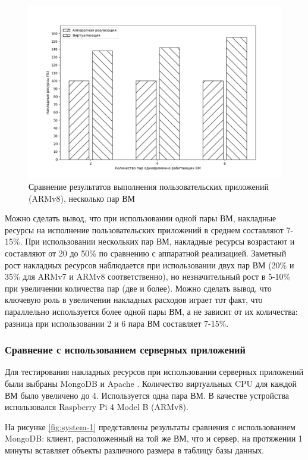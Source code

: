 \begin{figure}[h]
	\centering
	\includegraphics[width=\textwidth]{img/user-2-armv8.pdf}
	\caption{Сравнение результатов выполнения пользовательских приложений (ARMv8), несколько пар ВМ}
	\label{fig:perf-user-2-armv8}
\end{figure}

Можно сделать вывод, что при использовании одной пары ВМ, накладные ресурсы на исполнение пользовательских приложений в среднем составляют 7-15\%. При использовании нескольких пар ВМ, накладные ресурсы возрастают и составляют от 20 до 50\% по сравнению с аппаратной реализацией. Заметный рост накладных ресурсов наблюдается при использовании двух пар ВМ (20\% и 35\% для ARMv7 и ARMv8 соответственно), но незначительный рост в 5-10\% при увеличении количества пар (две и более). Можно сделать вывод, что ключевую роль в увеличении накладных расходов играет тот факт, что параллельно используется более одной пары ВМ, а не зависит от их количества: разница при использовании 2 и 6 пара ВМ составляет 7-15\%.

\subsubsection{Сравнение с использованием серверных приложений}

Для тестирования накладных ресурсов при использовании серверных приложений были выбраны MongoDB \cite{mongodb} и Apache \cite{Apache}. Количество виртуальных CPU для каждой ВМ было увеличено до 4. Используется одна пара ВМ. В качестве устройства использовался Raspberry Pi 4 Model B (ARMv8).

На рисунке \ref{fig:system-1} представлены результаты сравнения с использованием MongoDB: клиент, расположенный на той же ВМ, что и сервер, на протяжении 1 минуты вставляет объекты различного размера в таблицу базы данных. 

